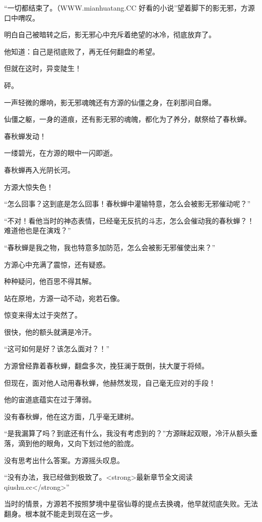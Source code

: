 
\begin{this_body}

“一切都结束了。（WWW.mianhuatang.CC 好看的小说”望着脚下的影无邪，方源口中喟叹。

明白自己被暗转之后，影无邪心中充斥着绝望的冰冷，彻底放弃了。

他知道：自己是彻底败了，再无任何翻盘的希望。

但就在这时，异变陡生！

砰。

一声轻微的爆响，影无邪魂魄还有方源的仙僵之身，在刹那间自爆。

仙僵之躯，一身的道痕，还有影无邪的魂魄，都化为了养分，献祭给了春秋蝉。

春秋蝉发动！

一缕碧光，在方源的眼中一闪即逝。

春秋蝉再入光阴长河。

方源大惊失色！

“怎么回事？这到底是怎么回事！春秋蝉中灌输特意，怎么会被影无邪催动呢？”

“不对！看他当时的神态表情，已经毫无反抗的斗志，怎么会催动我的春秋蝉？！难道他也是在演戏？”

“春秋蝉是我之物，我也特意多加防范，怎么会被影无邪催使出来？”

方源心中充满了震惊，还有疑惑。

种种疑问，他百思不得其解。

站在原地，方源一动不动，宛若石像。

惊变来得太过于突然了。

很快，他的额头就满是冷汗。

“这可如何是好？该怎么面对？！”

方源曾经靠着春秋蝉，翻盘多次，挽狂澜于既倒，扶大厦于将倾。

但现在，面对他人动用春秋蝉，他赫然发现，自己毫无应对的手段！

他的宙道底蕴实在过于薄弱。

没有春秋蝉，他在这方面，几乎毫无建树。

“是我漏算了吗？到底还有什么，我没有考虑到的？”方源眯起双眼，冷汗从额头垂落，滴到他的眼角，又向下划过他的脸庞。

没有思考出什么答案。方源摇头叹息。

“没有办法，我已经做到极致了。<strong>最新章节全文阅读qiushu.cc</strong>”

当时的情景，方源若不按照梦境中星宿仙尊的提点去换魂，他早就彻底失败。无法翻身。根本就不能走到现在这一步。


\end{this_body}
